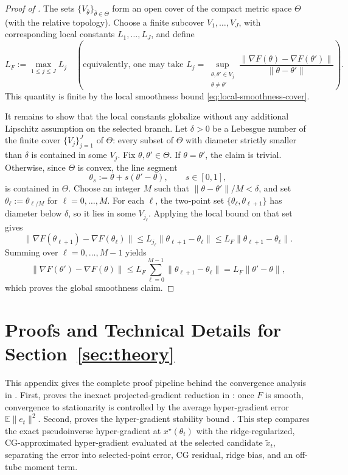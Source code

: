 \documentclass{article}
\theoremstyle{normaltheorem}
\begin{document}
\begin{proof}[Proof of ]
The sets $\{V_{\bar\theta}\}_{\bar\theta\in\Theta}$ form an open cover of the compact metric space $\Theta$ (with the relative topology).
Choose a finite subcover $V_1,\ldots,V_J$, with corresponding local constants $L_1,\ldots,L_J$, and define
\begin{equation}\label{eq:explicit-LF}
L_F
:=
\max_{1\le j\le J} L_j
\quad
\left(
\text{equivalently, one may take }
L_j
=
\sup_{\substack{\theta,\theta'\in V_j\\ \theta\neq\theta'}}
\frac{\|\nabla F(\theta)-\nabla F(\theta')\|}{\|\theta-\theta'\|}
\right).
\end{equation}
This quantity is finite by the local smoothness bound \eqref{eq:local-smoothness-cover}.

It remains to show that the local constants globalize without any additional Lipschitz assumption on the selected branch.
Let $\delta>0$ be a Lebesgue number of the finite cover $\{V_j\}_{j=1}^J$ of $\Theta$: every subset of $\Theta$ with diameter
strictly smaller than $\delta$ is contained in some $V_j$.
Fix $\theta,\theta'\in\Theta$. If $\theta=\theta'$, the claim is trivial.
Otherwise, since $\Theta$ is convex, the line segment
\[
\theta_s:=\theta+s(\theta'-\theta),\qquad s\in[0,1],
\]
is contained in $\Theta$. Choose an integer $M$ such that $\|\theta-\theta'\|/M<\delta$, and set
$\theta_\ell:=\theta_{\ell/M}$ for $\ell=0,\ldots,M$.
For each $\ell$, the two-point set $\{\theta_\ell,\theta_{\ell+1}\}$ has diameter below $\delta$, so it lies in some
$V_{j_\ell}$. Applying the local bound on that set gives
\[
\|\nabla F(\theta_{\ell+1})-\nabla F(\theta_\ell)\|
\le
L_{j_\ell}\|\theta_{\ell+1}-\theta_\ell\|
\le
L_F\|\theta_{\ell+1}-\theta_\ell\|.
\]
Summing over $\ell=0,\ldots,M-1$ yields
\[
\|\nabla F(\theta')-\nabla F(\theta)\|
\le
L_F\sum_{\ell=0}^{M-1}\|\theta_{\ell+1}-\theta_\ell\|
=
L_F\|\theta'-\theta\|,
\]
which proves the global smoothness claim.
\end{proof}

\section{Proofs and Technical Details for Section~\ref{sec:theory}}\label{append:outer-proof}
This appendix gives the complete proof pipeline behind the convergence analysis in . 
First,  proves the inexact projected-gradient reduction in : once \(F\) is smooth, convergence to stationarity is controlled by the average hyper-gradient error \(\mathbb E\|e_t\|^2\). 
Second,  proves the hyper-gradient stability bound . This step compares the exact pseudoinverse hyper-gradient at \(x^\star(\theta_t)\) with the ridge-regularized, CG-approximated hyper-gradient evaluated at the selected candidate \(\tilde x_t\), separating the error into selected-point error, CG residual, ridge bias, and an off-tube moment term.
\end{document}
